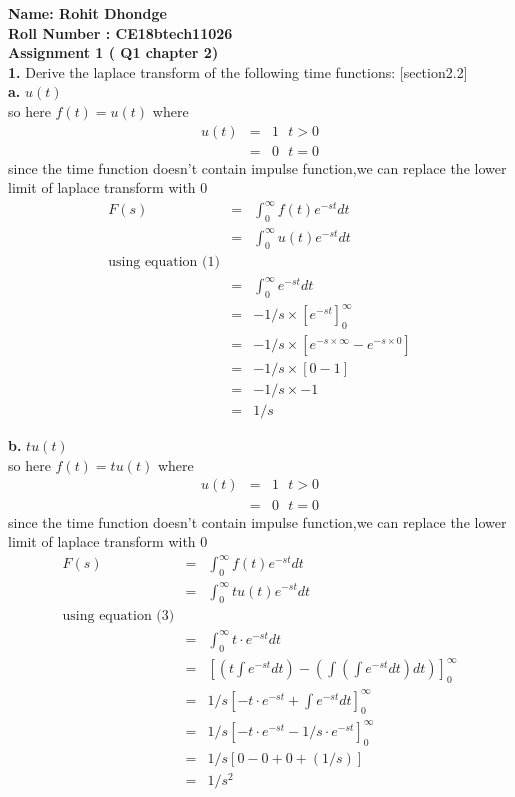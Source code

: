 \documentclass{article}
\begin{document}
\noindent \textbf{Name: Rohit Dhondge\\Roll Number : CE18btech11026 \\ Assignment 1 ( Q1 chapter 2)}\\
\noindent \textbf{1.} Derive the laplace transform of  the following time functions: [section2.2]\\
\textbf{a.} $u(t)$\\
so here $f(t) = u(t)$
where
\begin{eqnarray}
u(t) & = & 1 \ \ \  t>0\\
& = & 0 \ \ \  t=0
\end{eqnarray}
since the time function doesn't contain impulse function,we can replace the lower limit of laplace transform with 0
\begin{eqnarray*}
F(s) & = & \int_0^{\infty} f(t)e^{-st}dt\\
& = & \int_0^{\infty} u(t)e^{-st}dt\\
\mbox{using equation (1)}\\
& = & \int_0^{\infty} e^{-st}dt\\
& = & -1/s \times [e^{-st}]_0^{\infty}\\
& = & -1/s \times [e^{-s\times \infty} - e^{-s \times 0}]\\
& = & -1/s \times [0-1]\\
& = & -1/s \times -1\\
& = & 1/s
\end{eqnarray*}

\noindent \textbf{b.} $tu(t)$\\
so here $f(t) = tu(t)$
where
\begin{eqnarray}
u(t) & = & 1 \ \ \  t>0\\
& = & 0 \ \ \  t=0
\end{eqnarray}
since the time function doesn't contain impulse function,we can replace the lower limit of laplace transform with 0
\begin{eqnarray*}
F(s) & = & \int_0^\infty f(t)e^{-st}dt\\
& = & \int_0^\infty tu(t)e^{-st}dt\\
\mbox{using equation (3)}\\
& = & \int_0^\infty t\cdot e^{-st}dt\\
& = & [(t\int e^{-st}dt) - (\int (\int e^{-st}dt)dt)]_0^\infty \\
& = & 1/s[ -t\cdot e^{-st} + \int e^{-st}dt]_0^\infty \\
& = & 1/s[ -t\cdot e^{-st} - 1/s\cdot e^{-st}]_0^\infty \\
& = & 1/s[ 0 - 0 + 0 + (1/s)] \\
& = & 1/s^2 \\
\end{eqnarray*}
\end{document}
